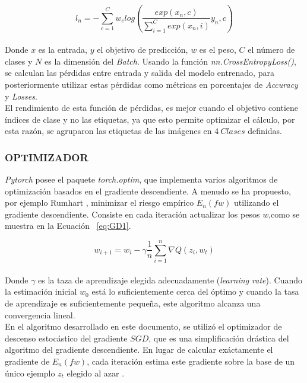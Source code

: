 \begin{equation}
	\label{eq:perd}
	{l_n=-\sum_{c=1}^{C}w_c log\left(\frac{exp(x_n,c)}{\sum_{i=1}^{C}exp(x_n,i)}y_n,c\right)}
\end{equation}\\

Donde $x$ es la entrada, $y$ el objetivo de predicción, $w$ es el peso, $C$ el número de clases y $N$ es la dimensión del \textit{Batch}. Usando la función \textit{nn.CrossEntropyLoss()}, se calculan las pérdidas entre entrada y salida del modelo entrenado, para posteriormente utilizar estas pérdidas como métricas en porcentajes de \textit{Accuracy} y \textit{Losses}.\\			

El rendimiento de esta función de pérdidas, es mejor cuando el objetivo contiene índices de clase y no las etiquetas, ya que esto permite optimizar el cálculo, por esta razón, se agruparon las etiquetas de las imágenes en $4 \ Clases$ definidas.

\subsubsection{OPTIMIZADOR}

\textit{Pytorch} posee el paquete \textit{torch.optim}, que implementa varios algoritmos de optimización basados en el gradiente descendiente. A menudo se ha propuesto, por ejemplo Rumhart \cite{rumelhart1986learning}, minimizar el riesgo empírico $E_n(fw)$ utilizando el gradiente descendiente. Consiste en cada iteración actualizar los pesos $w$,como se muestra en la Ecuación ~\ref{eq:GD1}.


\begin{equation}
	\label{eq:GD1}
	{w_{i+1}=w_i-\gamma\frac{1}{n}\sum_{i=1}^{n}\nabla Q(z_i,w_t)}
\end{equation}\\

Donde $\gamma$ es la taza de aprendizaje elegida adecuadamente (\textit{learning rate}). Cuando la estimación inicial $w_0$ está lo suficientemente cerca del óptimo y cuando la tasa de aprendizaje es suficientemente pequeña, este algoritmo alcanza una convergencia lineal.\\


En el algoritmo desarrollado en este documento, se utilizó el optimizador de descenso estocástico del gradiente $SGD$, que es una simplificación drástica del algoritmo del gradiente descendiente. En lugar de calcular exáctamente el gradiente de $E_n(fw)$, cada iteración estima este gradiente sobre la base de un único ejemplo $z_t$ elegido al azar \cite{bottou2012stochastic}.

